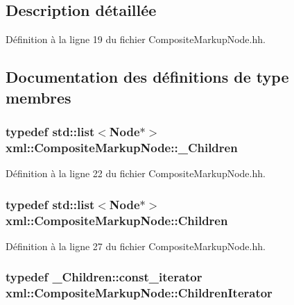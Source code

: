 \subsection{Description détaillée}


Définition à la ligne 19 du fichier CompositeMarkupNode.hh.



\subsection{Documentation des définitions de type membres}
\hypertarget{classxml_1_1_composite_markup_node_a48287f15a3192f936b0be50e1b2ea13e}{
\subsubsection[{\_\-Children}]{\setlength{\rightskip}{0pt plus 5cm}typedef std::list$<${\bf Node}$\ast$$>$ {\bf xml::CompositeMarkupNode::\_\-Children}}}
\label{classxml_1_1_composite_markup_node_a48287f15a3192f936b0be50e1b2ea13e}


Définition à la ligne 22 du fichier CompositeMarkupNode.hh.

\hypertarget{classxml_1_1_composite_markup_node_ac70e1fdb5fc2e0011378f7284c31fe5c}{
\subsubsection[{Children}]{\setlength{\rightskip}{0pt plus 5cm}typedef std::list$<${\bf Node}$\ast$$>$ {\bf xml::CompositeMarkupNode::Children}}}
\label{classxml_1_1_composite_markup_node_ac70e1fdb5fc2e0011378f7284c31fe5c}


Définition à la ligne 27 du fichier CompositeMarkupNode.hh.

\hypertarget{classxml_1_1_composite_markup_node_abdd7123eab75fb90a4a95b1976693ed7}{
\subsubsection[{ChildrenIterator}]{\setlength{\rightskip}{0pt plus 5cm}typedef \_\-Children::const\_\-iterator {\bf xml::CompositeMarkupNode::ChildrenIterator}}}
\label{classxml_1_1_composite_markup_node_abdd7123eab75fb90a4a95b1976693ed7}


